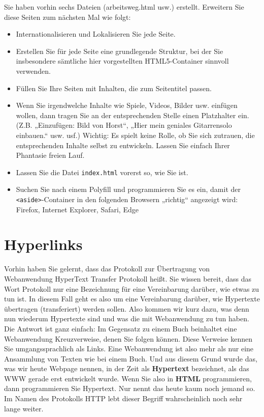 Sie haben vorhin sechs Dateien (arbeitsweg.html usw.) erstellt. Erweitern Sie diese Seiten zum nächsten Mal wie folgt:

\begin{itemize}
	\item Internationalisieren und Lokalisieren Sie jede Seite.
	\item Erstellen Sie für jede Seite eine grundlegende Struktur, bei der Sie insbesondere sämtliche hier vorgestellten HTML5-Container sinnvoll verwenden.
	\item Füllen Sie Ihre Seiten mit Inhalten, die zum Seitentitel passen.
	\item Wenn Sie irgendwelche Inhalte wie Spiele, Videos, Bilder usw. einfügen wollen, dann tragen Sie an der entsprechenden Stelle einen Platzhalter ein. (Z.B. „Einzufügen: Bild von Horst“, „Hier mein geniales Gitarrensolo einbauen.“ usw. usf.) Wichtig: Es spielt keine Rolle, ob Sie sich zutrauen, die entsprechenden Inhalte selbst zu entwickeln. Lassen Sie einfach Ihrer Phantasie freien Lauf.
	\item Lassen Sie die Datei \verb|index.html| vorerst so, wie Sie ist.          
	\item Suchen Sie nach einem Polyfill und programmieren Sie es ein, damit der \verb|<aside>|-Container in den folgenden Browsern „richtig“ angezeigt wird: Firefox, Internet Explorer, Safari, Edge
\end{itemize}

\section{Hyperlinks}

Vorhin haben Sie gelernt, dass das Protokoll zur Übertragung von Webanwendung HyperText Transfer Protokoll heißt. Sie wissen bereit, dass das Wort Protokoll nur eine Bezeichnung für eine Vereinbarung darüber, wie etwas zu tun ist. In diesem Fall geht es also um eine Vereinbarung darüber, wie Hypertexte übertragen (transferiert) werden sollen. Also kommen wir kurz dazu, was denn nun wiederum Hypertexte sind und was die mit Webanwendung zu tun haben.\\

Die Antwort ist ganz einfach: Im Gegensatz zu einem Buch beinhaltet eine Webanwendung Kreuzverweise, denen Sie folgen können. Diese Verweise kennen Sie umgangssprachlich als Links. Eine Webanwendung ist also mehr als nur eine Ansammlung von Texten wie bei einem Buch. Und aus diesem Grund wurde das, was wir heute Webpage nennen, in der Zeit als \textbf{Hypertext} bezeichnet, als das WWW gerade erst entwickelt wurde. Wenn Sie also in \textbf{HTML} programmieren, dann programmieren Sie Hypertext. Nur nennt das heute kaum noch jemand so. Im Namen des Protokolls HTTP lebt dieser Begriff wahrscheinlich noch sehr lange weiter.\\

